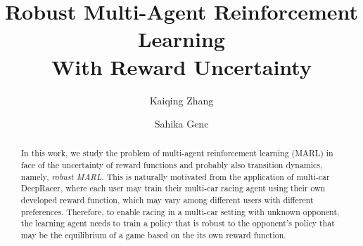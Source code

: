 \documentclass{article}
\author{Kaiqing Zhang \and Sahika Genc}
\begin{document}
\title{Robust Multi-Agent Reinforcement Learning\\
 With Reward Uncertainty}


\maketitle   
   
 


\begin{abstract}
In this work, we study the problem of multi-agent reinforcement learning (MARL) in face of the uncertainty of reward functions and probably also transition dynamics, namely, \emph{robust MARL}.  This is naturally motivated from the application of multi-car DeepRacer, where each user may train their multi-car racing agent using their own developed reward function, which may vary among different users with different preferences. Therefore, to enable racing in a multi-car setting with unknown opponent, the learning agent needs to train a policy that is robust to the opponent's policy that may be the equilibrium of a game based on the its own  reward function. 
\end{abstract}
 
 
 
 










% 







 

\newpage




\appendix




 
\end{document}
